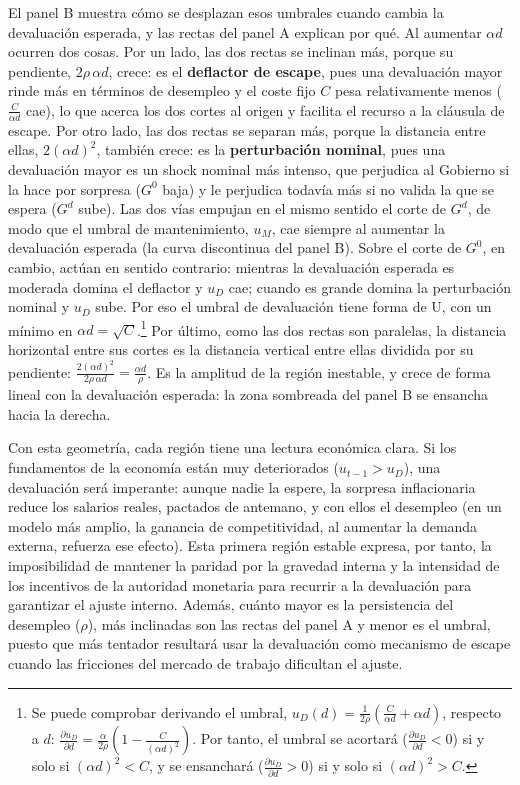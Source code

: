 \documentclass[10pt,a4paper]{article}
\begin{document}
El panel B muestra cómo se desplazan esos umbrales cuando cambia la devaluación esperada, y las rectas del panel A explican por qué. Al aumentar $\alpha d$ ocurren dos cosas. Por un lado, las dos rectas se inclinan más, porque su pendiente, $2\rho\,\alpha d$, crece: es el \textbf{deflactor de escape}, pues una devaluación mayor rinde más en términos de desempleo y el coste fijo $C$ pesa relativamente menos ($\frac{C}{\alpha d}$ cae), lo que acerca los dos cortes al origen y facilita el recurso a la cláusula de escape. Por otro lado, las dos rectas se separan más, porque la distancia entre ellas, $2(\alpha d)^2$, también crece: es la \textbf{perturbación nominal}, pues una devaluación mayor es un shock nominal más intenso, que perjudica al Gobierno si la hace por sorpresa ($G^0$ baja) y le perjudica todavía más si no valida la que se espera ($G^d$ sube). Las dos vías empujan en el mismo sentido el corte de $G^d$, de modo que el umbral de mantenimiento, $u_M$, cae siempre al aumentar la devaluación esperada (la curva discontinua del panel B). Sobre el corte de $G^0$, en cambio, actúan en sentido contrario: mientras la devaluación esperada es moderada domina el deflactor y $u_D$ cae; cuando es grande domina la perturbación nominal y $u_D$ sube. Por eso el umbral de devaluación tiene forma de U, con un mínimo en $\alpha d=\sqrt{C}$.\footnote{%
    Se puede comprobar derivando el umbral, $u_D(d)=\frac{1}{2\rho}\left(\frac{C}{\alpha d}+\alpha d\right)$, respecto a $d$: $\frac{\partial u_D}{\partial d}=\frac{\alpha}{2\rho}\left(1-\frac{C}{(\alpha d)^2}\right)$. Por tanto, el umbral se acortará ($\frac{\partial u_D}{\partial d}<0$) si y solo si $(\alpha d)^2<C$, y se ensanchará ($\frac{\partial u_D}{\partial d}>0$) si y solo si $(\alpha d)^2>C$.
} Por último, como las dos rectas son paralelas, la distancia horizontal entre sus cortes es la distancia vertical entre ellas dividida por su pendiente: $\frac{2(\alpha d)^2}{2\rho\,\alpha d}=\frac{\alpha d}{\rho}$. Es la amplitud de la región inestable, y crece de forma lineal con la devaluación esperada: la zona sombreada del panel B se ensancha hacia la derecha.

Con esta geometría, cada región tiene una lectura económica clara. Si los fundamentos de la economía están muy deteriorados ($u_{t-1}>u_D$), una devaluación será imperante: aunque nadie la espere, la sorpresa inflacionaria reduce los salarios reales, pactados de antemano, y con ellos el desempleo (en un modelo más amplio, la ganancia de competitividad, al aumentar la demanda externa, refuerza ese efecto). Esta primera región estable expresa, por tanto, la imposibilidad de mantener la paridad por la gravedad interna y la intensidad de los incentivos de la autoridad monetaria para recurrir a la devaluación para garantizar el ajuste interno. Además, cuánto mayor es la persistencia del desempleo ($\rho$), más inclinadas son las rectas del panel A y menor es el umbral, puesto que más tentador resultará usar la devaluación como mecanismo de escape cuando las fricciones del mercado de trabajo dificultan el ajuste.
\end{document}
